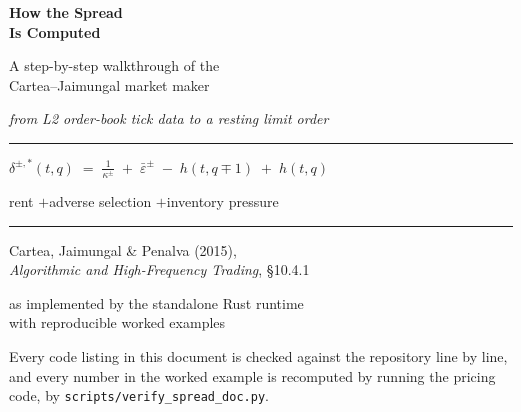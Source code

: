 \documentclass[11pt,a4paper]{article}
\newcommand{\epsb}{\bar{\varepsilon}}
\newcommand{\code}[1]{\texttt{\small #1}}
\begin{document}
\begin{titlepage}
\centering
\vspace*{1.6cm}

{\Huge\bfseries How the Spread\\[0.2cm] Is Computed\par}

\vspace{0.9cm}
{\Large A step-by-step walkthrough of the\\[0.15cm]
Cartea--Jaimungal market maker\par}

\vspace{0.5cm}
{\large\itshape from L2 order-book tick data to a resting limit order\par}

\vspace{1.5cm}
{\color{NavyLink}\rule{0.76\textwidth}{1pt}}

\vspace{0.9cm}
{\Large$\displaystyle
  \delta^{\pm,*}(t,q)\;=\;\frac{1}{\kappa^{\pm}}
  \;+\;\epsb^{\pm}\;-\;h(t,q\mp 1)\;+\;h(t,q)$\par}

\vspace{0.55cm}
{\color{NavyLink}\large
  rent \quad$+$\quad adverse selection \quad$+$\quad inventory pressure\par}

\vspace{0.9cm}
{\color{NavyLink}\rule{0.76\textwidth}{1pt}}

\vspace{1.6cm}
{\large Cartea, Jaimungal \& Penalva (2015),\\[0.1cm]
\emph{Algorithmic and High-Frequency Trading}, \S10.4.1\par}

\vspace{0.7cm}
{\large as implemented by the standalone Rust runtime\\[0.2cm]
with reproducible worked examples\par}

\vfill
{\small Every code listing in this document is checked against the repository
line by line, and every number in the worked example is recomputed by running
the pricing code, by \code{scripts/verify\_spread\_doc.py}.\par}
\vspace{1.2cm}
\end{titlepage}
\end{document}
